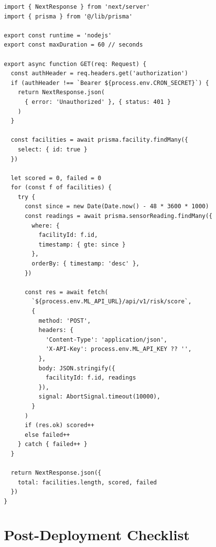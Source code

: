 \documentclass[12pt,a4paper]{report}
\begin{document}
\begin{lstlisting}[caption={app/api/cron/score-risks/route.ts}]
import { NextResponse } from 'next/server'
import { prisma } from '@/lib/prisma'

export const runtime = 'nodejs'
export const maxDuration = 60 // seconds

export async function GET(req: Request) {
  const authHeader = req.headers.get('authorization')
  if (authHeader !== `Bearer ${process.env.CRON_SECRET}`) {
    return NextResponse.json(
      { error: 'Unauthorized' }, { status: 401 }
    )
  }

  const facilities = await prisma.facility.findMany({
    select: { id: true }
  })

  let scored = 0, failed = 0
  for (const f of facilities) {
    try {
      const since = new Date(Date.now() - 48 * 3600 * 1000)
      const readings = await prisma.sensorReading.findMany({
        where: {
          facilityId: f.id,
          timestamp: { gte: since }
        },
        orderBy: { timestamp: 'desc' },
      })

      const res = await fetch(
        `${process.env.ML_API_URL}/api/v1/risk/score`,
        {
          method: 'POST',
          headers: {
            'Content-Type': 'application/json',
            'X-API-Key': process.env.ML_API_KEY ?? '',
          },
          body: JSON.stringify({
            facilityId: f.id, readings
          }),
          signal: AbortSignal.timeout(10000),
        }
      )
      if (res.ok) scored++
      else failed++
    } catch { failed++ }
  }

  return NextResponse.json({
    total: facilities.length, scored, failed
  })
}
\end{lstlisting}

\section{Post-Deployment Checklist}
\end{document}
